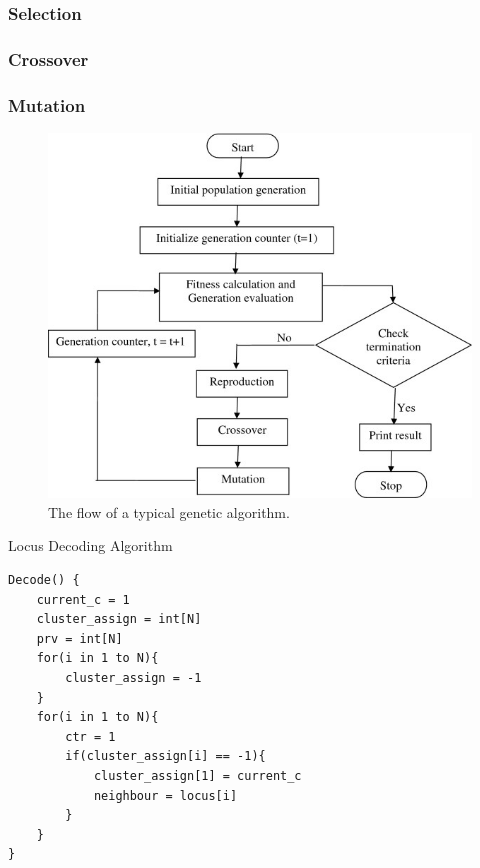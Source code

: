 \subsubsection{Selection}


\subsubsection{Crossover}


\subsubsection{Mutation}



\begin{figure}[!htb]
	\begin{center}
		\includegraphics[scale=.75]{images/genetic_typical.png}
	\end{center}
	\caption{The flow of a typical genetic algorithm.}
	\label{logo}
\end{figure}

\begin{table}[b]
\caption{Locus Decoding Algorithm}
\label{algorithmX}
\begin{verbatim}
Decode() {
    current_c = 1
    cluster_assign = int[N]
    prv = int[N]
    for(i in 1 to N){
        cluster_assign = -1
    }
    for(i in 1 to N){
        ctr = 1
        if(cluster_assign[i] == -1){
            cluster_assign[1] = current_c
            neighbour = locus[i]
        }
    }
}
\end{verbatim}
\end{table}

